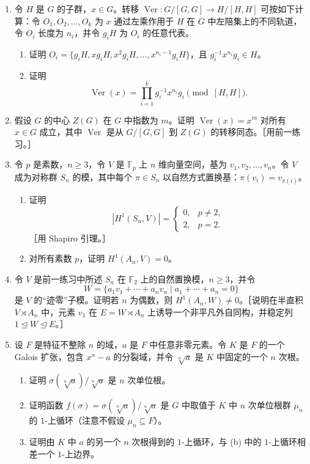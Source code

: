 \begin{enumerate}[label=\arabic*.]
  \item 令 $H$ 是 $G$ 的子群，$x\in G$。转移 $\operatorname{Ver}:G/[G,G]\to H/[H,H]$ 可按如下计算：令 $O_1,O_2,
  \ldots,O_k$ 为 $x$ 通过左乘作用于 $H$ 在 $G$ 中左陪集上的不同轨道，令 $O_i$ 长度为 $n_i$，并令 $g_iH$ 为 $O_i$ 的任意代表。
  \begin{enumerate}[label=(\alph*)]
    \item 证明 $O_i=\{g_iH,xg_iH,x^2g_iH,
    \ldots,x^{n_i-1}g_iH\}$，且 $g_i^{-1}x^{n_i}g_i\in H$。
    \item 证明
    \[
      \operatorname{Ver}(x)=\prod_{i=1}^k g_i^{-1}x^{n_i}g_i\pmod{[H,H]}.
    \]
  \end{enumerate}

  \item 假设 $G$ 的中心 $Z(G)$ 在 $G$ 中指数为 $m$。证明 $\operatorname{Ver}(x)=x^m$ 对所有 $x\in G$ 成立，其中 $\operatorname{Ver}$ 是从 $G/[G,G]$ 到 $Z(G)$ 的转移同态。［用前一练习。］

  \item 令 $p$ 是素数，$n\geq3$，令 $V$ 是 $\mathbb F_p$ 上 $n$ 维向量空间，基为 $v_1,v_2,
  \ldots,v_n$。令 $V$ 成为对称群 $S_n$ 的模，其中每个 $\pi\in S_n$ 以自然方式置换基：$\pi(v_i)=v_{\pi(i)}$。
  \begin{enumerate}[label=(\alph*)]
    \item 证明
    \[
    |H^1(S_n,V)|=\begin{cases}0,&p\neq2,\\2,&p=2.
    \end{cases}
    \]
    ［用 Shapiro 引理。］
    \item 对所有素数 $p$，证明 $H^1(A_n,V)=0$。
  \end{enumerate}

  \item 令 $V$ 是前一练习中所述 $S_n$ 在 $\mathbb F_2$ 上的自然置换模，$n\geq3$，并令
  \[
    W=\{a_1v_1+\cdots+a_nv_n\mid a_1+\cdots+a_n=0\}
  \]
  是 $V$ 的“迹零”子模。证明若 $n$ 为偶数，则 $H^1(A_n,W)\neq0$。［说明在半直积 $V\rtimes A_n$ 中，元素 $v_1$ 在 $E=W\rtimes A_n$ 上诱导一个非平凡外自同构，并稳定列 $1\trianglelefteq W\trianglelefteq E$。］

  \item 设 $F$ 是特征不整除 $n$ 的域，$a$ 是 $F$ 中任意非零元素。令 $K$ 是 $F$ 的一个 Galois 扩张，包含 $x^n-a$ 的分裂域，并令 $\sqrt[n]{a}$ 是 $K$ 中固定的一个 $n$ 次根。
  \begin{enumerate}[label=(\alph*)]
    \item 证明 $\sigma(\sqrt[n]{a})/\sqrt[n]{a}$ 是 $n$ 次单位根。
    \item 证明函数 $f(\sigma)=\sigma(\sqrt[n]{a})/\sqrt[n]{a}$ 是 $G$ 中取值于 $K$ 中 $n$ 次单位根群 $\mu_n$ 的 $1$-上循环（注意不假设 $\mu_n\subseteq F$）。
    \item 证明由 $K$ 中 $a$ 的另一个 $n$ 次根得到的 $1$-上循环，与 (b) 中的 $1$-上循环相差一个 $1$-上边界。
  \end{enumerate}


\end{enumerate}
